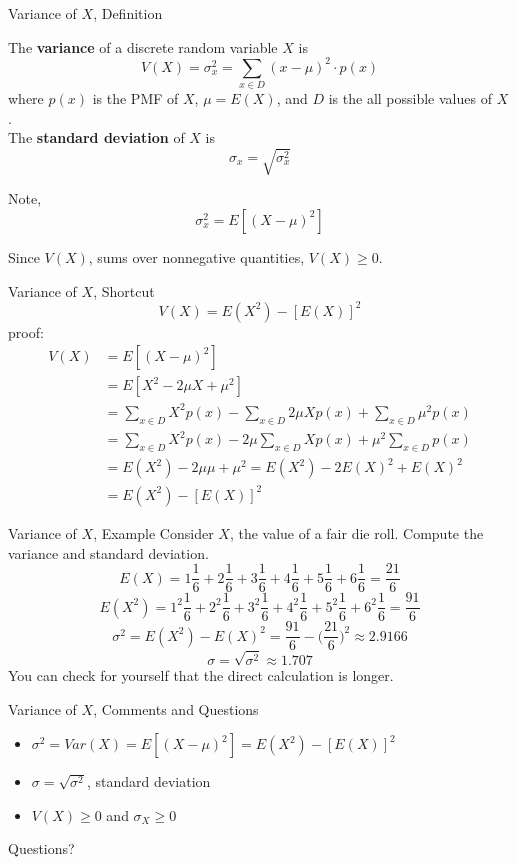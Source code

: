 \documentclass[]{beamer}
\newcommand{\qtns}[0]{\begin{center} Questions? \end{center}}
\newcommand{\nl}[1]{\vspace{#1 em}}
\begin{document}
\begin{frame}{Variance of $X$, Definition}
    \begin{block}{}
        The \textbf{variance} of a discrete random variable $X$ is 
        $$V(X) = \sigma^2_x = \sum_{x \in D} (x-\mu)^2 \cdot p(x) $$
        where $p(x)$ is the PMF of $X$, $\mu = E(X)$, and $D$ is the all possible values of $X$.\\ \nl{0.5}
        The \textbf{standard deviation} of $X$ is
        $$ \sigma_x = \sqrt{\sigma_x^2} $$
    \end{block}
    Note,
    $$\sigma_x^2 = E[(X-\mu)^2]$$
    \begin{block}{}
    Since $V(X)$, sums over nonnegative quantities, $V(X) \geq 0$.
    \end{block}
\end{frame}

\begin{frame}{Variance of $X$, Shortcut}
    $$V(X) = E(X^2) - [E(X)]^2$$
    proof:
    \begin{align*}
        V(X) & = E[(X-\mu)^2] \\
        & = E[X^2 -2\mu X + \mu^2] \\
        & = \sum_{x \in D} X^2 p(x) - \sum_{x \in D} 2\mu X p(x) + \sum_{x \in D} \mu^2 p(x) \\
        & = \sum_{x \in D} X^2 p(x) - 2 \mu \sum_{x \in D} X p(x) + \mu^2 \sum_{x \in D} p(x) \\
        & = E(X^2) - 2 \mu \mu + \mu^2 = E(X^2) - 2 E(X)^2 + E(X)^2\\
        & = E(X^2) - [E(X)]^2
    \end{align*}
\end{frame}

\begin{frame}{Variance of $X$, Example}
    Consider $X$, the value of a fair die roll. Compute the variance and standard deviation.
    \pause
    $$ E(X) = 1 \frac{1}{6} + 2\frac{1}{6} + 3 \frac{1}{6} + 4 \frac{1}{6} + 5 \frac{1}{6} + 6\frac{1}{6} = \frac{21}{6}$$
    \pause
    $$ E(X^2) = 1^2 \frac{1}{6} + 2^2 \frac{1}{6} + 3^2 \frac{1}{6} + 4^2 \frac{1}{6} + 5^2 \frac{1}{6} + 6^2 \frac{1}{6} = \frac{91}{6}$$
    \pause
    $$ \sigma^2 = E(X^2) - E(X)^2 = \frac{91}{6} - \Big(\frac{21}{6}\Big)^2 \approx 2.9166$$
    $$ \sigma = \sqrt{\sigma^2} \approx 1.707$$
    You can check for yourself that the direct calculation is longer.
\end{frame}

\begin{frame}{Variance of $X$, Comments and Questions}
    \begin{itemize}
        \item $\sigma^2 = Var(X) = E[(X-\mu)^2] = E(X^2) - [E(X)]^2$
        \item $\sigma = \sqrt{\sigma^2}$, standard deviation
        \item $V(X) \geq 0$ and $\sigma_X \geq 0$
    \end{itemize}
    \qtns
\end{frame}
\end{document}
